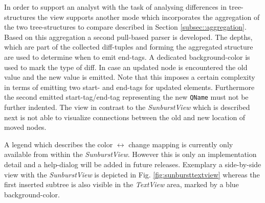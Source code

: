 \begin{itemize}
In order to support an analyst with the task of analysing differences in tree-structures the view supports another mode which incorporates the aggregation of the two tree-structures to compare described in Section \ref{subsec::aggregation}. Based on this aggregation a second pull-based parser is developed. The depths, which are part of the collected diff-tuples and forming the aggregated structure are used to determine when to emit end-tags. A dedicated background-color is used to mark the type of diff. In case an updated node is encountered the old value and the new value is emitted. Note that this imposes a certain complexity in terms of emitting two start- and end-tags for updated elements. Furthermore the second emitted start-tag/end-tag representing the new \texttt{QName} must not be further indented. The view in contrast to the \emph{SunburstView} which is described next is not able to visualize connections between the old and new location of moved nodes. %

A legend which describes the color $\leftrightarrow$ change mapping is currently only available from within the \emph{SunburstView}. However this is only an implementation detail and a help-dialog will be added in future releases. Exemplary a side-by-side view with the \emph{SunburstView} is depicted in Fig. \ref{fig:sunbursttextview} whereas the first inserted subtree is also visible in the \emph{TextView} area, marked by a blue background-color. 


\end{itemize}
